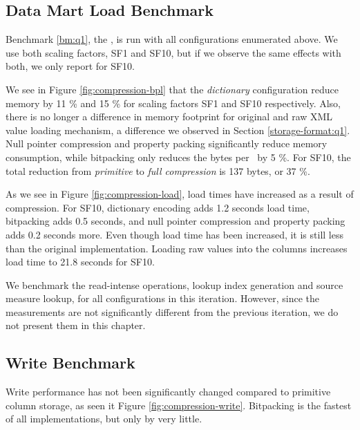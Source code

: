 \subsection{Data Mart Load Benchmark}
\label{compression:q1}
Benchmark \ref{bm:q1}, the \tpchdl, is run with all configurations enumerated above. We use both scaling factors, SF1 and SF10, but if we observe the same effects with both, we only report for SF10.

We see in Figure \ref{fig:compression-bpl} that the \textit{dictionary} configuration reduce memory by 11 \% and 15 \% for scaling factors SF1 and SF10 respectively. Also, there is no longer a difference in memory footprint for original and raw XML value loading mechanism, a difference we observed in Section \ref{storage-format:q1}. Null pointer compression and property packing significantly reduce memory consumption, while bitpacking only reduces the bytes per \lineitem~by 5 \%. For SF10, the total reduction from \textit{primitive} to \textit{full compression} is 137 bytes, or 37 \%.

As we see in Figure \ref{fig:compression-load}, load times have increased as a result of compression. For SF10, dictionary encoding adds 1.2 seconds load time, bitpacking adds 0.5 seconds, and null pointer compression and property packing adds 0.2 seconds more. Even though load time has been increased, it is still less than the original implementation. Loading raw values into the columns increases load time to 21.8 seconds for SF10.

We benchmark the read-intense operations, lookup index generation and source measure lookup, for all configurations in this iteration. However, since the measurements are not significantly different from the previous iteration, we do not present them in this chapter. 

\subsection{Write Benchmark}
\label{compression:write}
Write performance has not been significantly changed compared to primitive column storage, as seen it Figure \ref{fig:compression-write}. Bitpacking is the fastest of all implementations, but only by very little.

